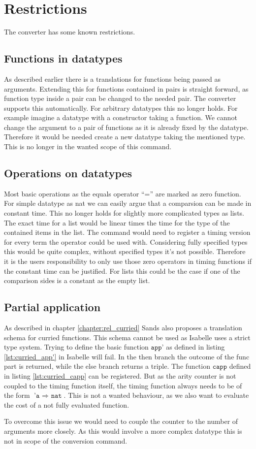 
\section{Restrictions} \label{chapter:restrictions}
The converter has some known restrictions.

\subsection{Functions in datatypes}
As described earlier there is a translations for functions being passed as arguments.
Extending this for functions contained in pairs is straight forward, as function type inside a pair can be changed to the needed pair.
The converter supports this automatically.
For arbitrary datatypes this no longer holds.
For example imagine a datatype with a constructor taking a function.
We cannot change the argument to a pair of functions as it is already fixed by the datatype.
Therefore it would be needed create a new datatype taking the mentioned type.
This is no longer in the wanted scope of this command.

\subsection{Operations on datatypes} \label{chapter:nonconstant_zeros}
Most basic operations as the equals operator ``='' are marked as zero function.
For simple datatype as nat we can easily argue that a comparsion can be made in constant time.
This no longer holds for slightly more complicated types as lists.
The exact time for a list would be linear times the time for the type of the contained items in the list.
The command would need to register a timing version for every term the operator could be used with.
Considering fully specified types this would be quite complex, without specified types it's not possible.
Therefore it is the users responsibility to only use those zero operators in timing functions if the constant time can be justified.
For lists this could be the case if one of the comparison sides is a constant as the empty list.

\subsection{Partial application}

As described in chapter \ref{chapter:rel_curried} Sands also proposes a translation schema for curried functions.
This schema cannot be used as Isabelle uses a strict type system.
Trying to define the basic function $\texttt{app'}$ as defined in listing \ref{lst:curried_app'} in Isabelle will fail.
In the then branch the outcome of the func part is returned, while the else branch returns a triple.
The function $\texttt{capp}$ defined in listing \ref{lst:curried_capp} can be registered.
But as the arity counter is not coupled to the timing function itself, the timing function always needs to be of the form $\texttt{'a $\Rightarrow$ nat}$.
This is not a wanted behaviour, as we also want to evaluate the cost of a not fully evaluated function.

To overcome this issue we would need to couple the counter to the number of arguments more closely.
As this would involve a more complex datatype this is not in scope of the conversion command.
